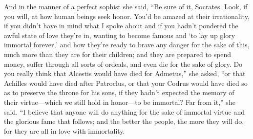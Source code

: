 And in the manner of a perfect sophist she said, “Be sure of it,
Socrates. Look, if you will, at how human beings seek honor. You’d be
amazed at their irrationality, if you didn’t have in mind what I spoke
about and if you hadn’t pondered the awful state of love they’re in,
wanting to become famous and ‘to lay up glory immortal forever,’ and how
they’re ready to brave any danger for the sake of this, much more than
they are for their children; and they are prepared to spend money,
suffer through all sorts of ordeals, and even die for the sake of glory.
Do you really think that  Alcestis would have died for Admetus,”
she asked, “or that Achilles would have died after Patroclus, or that
your Codrus would have died so as to preserve the throne for his
sons, if they hadn’t
expected the memory of their virtue---which we still hold in honor---to
be immortal? Far from it,” she said. “I believe that anyone will do
anything for the sake of immortal virtue and the glorious fame that
follows; and the better the people, the  more they will do, for
they are all in love with immortality.

